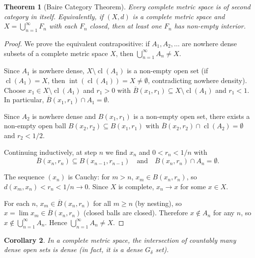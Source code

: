 \documentclass[11pt,a4paper]{article}
\theoremstyle{definition}
\theoremstyle{plain}
\newtheorem{theorem}{Theorem}[section]
\newtheorem{corollary}[theorem]{Corollary}
\theoremstyle{remark}
\DeclareMathOperator{\Int}{int}
\DeclareMathOperator{\cl}{cl}
\begin{document}
\begin{theorem}[Baire Category Theorem]
\label{thm:baire}
Every complete metric space is of second category in itself. Equivalently, if
$(X,d)$ is a complete metric space and $X = \bigcup_{n=1}^\infty F_n$ with each
$F_n$ closed, then at least one $F_n$ has non-empty interior.
\end{theorem}

\begin{proof}
We prove the equivalent contrapositive: if $A_1, A_2, \ldots$ are nowhere dense
subsets of a complete metric space $X$, then $\bigcup_{n=1}^\infty A_n \ne X$.

Since $A_1$ is nowhere dense, $X \setminus \cl(A_1)$ is a non-empty open set (if
$\cl(A_1) = X$, then $\Int(\cl(A_1)) = X \ne \emptyset$, contradicting nowhere
density). Choose $x_1 \in X \setminus \cl(A_1)$ and $r_1 > 0$ with
$\overline{B}(x_1, r_1) \subseteq X \setminus \cl(A_1)$ and $r_1 < 1$. In
particular, $\overline{B}(x_1, r_1) \cap A_1 = \emptyset$.

Since $A_2$ is nowhere dense and $B(x_1, r_1)$ is a non-empty open set, there
exists a non-empty open ball $B(x_2, r_2) \subseteq B(x_1, r_1)$ with
$\overline{B}(x_2, r_2) \cap \cl(A_2) = \emptyset$ and $r_2 < 1/2$.

Continuing inductively, at step $n$ we find $x_n$ and $0 < r_n < 1/n$ with
\[
\overline{B}(x_n, r_n) \subseteq B(x_{n-1}, r_{n-1}) \quad \text{and} \quad
\overline{B}(x_n, r_n) \cap A_n = \emptyset.
\]

The sequence $(x_n)$ is Cauchy: for $m > n$, $x_m \in B(x_n, r_n)$, so
$d(x_m, x_n) < r_n < 1/n \to 0$. Since $X$ is complete, $x_n \to x$ for some
$x \in X$.

For each $n$, $x_m \in \overline{B}(x_n, r_n)$ for all $m \ge n$ (by nesting), so
$x = \lim x_m \in \overline{B}(x_n, r_n)$ (closed balls are closed). Therefore
$x \notin A_n$ for any $n$, so $x \notin \bigcup_{n=1}^\infty A_n$. Hence
$\bigcup_{n=1}^\infty A_n \ne X$.
\end{proof}

\begin{corollary}
\label{cor:baire_dense}
In a complete metric space, the intersection of countably many dense open sets is
dense (in fact, it is a dense $G_\delta$ set).
\end{corollary}
\end{document}
